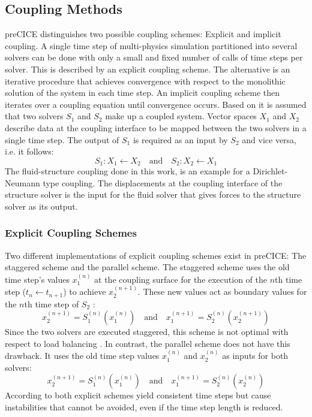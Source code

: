  \subsection{Coupling Methods} %
  preCICE distinguishes two possible coupling schemes: Explicit and implicit coupling. A single time step of multi-physics simulation partitioned into several solvers can be done with only a small and fixed number of calls of time steps per solver. This is described by an explicit coupling scheme. The alternative is an iterative procedure that achieves convergence with respect to the monolithic solution of the system in each time step. An implicit coupling scheme then iterates over a coupling equation until convergence occurs. Based on \cite{bungartz2015fully} it is assumed that two solvers $S_1$ and $S_2$ make up a coupled system. Vector spaces $X_1$ and $X_2$ describe data at the coupling interface to be mapped between the two solvers in a single time step. The output of $S_1$ is required as an input by $S_2$ and vice versa, i.e. it follows:
  \begin{equation}
  S_1: X_1 \leftarrow X_2\quad \text{and}\quad S_2:X_2 \leftarrow X_1
  \end{equation}
  The fluid-structure coupling done in this work, is an example for a Dirichlet-Neumann type coupling. The displacements at the coupling interface of the structure solver is the input for the fluid solver that gives forces to the structure solver as its output.
 
  \subsubsection{Explicit Coupling Schemes}
   Two different implementations of explicit coupling schemes exist in preCICE: The staggered scheme and the parallel scheme. The staggered scheme uses the old time step's values $x_1^{(n)}$ at the coupling surface for the execution of the $n$th time step ($t_n \leftarrow t_{n+1}$) to achieve $x_2^{(n+1)}$. These new values act as boundary values for the $n$th time step of $S_2$ \cite{bungartz2015fully}:
   \begin{equation}
   x_2^{(n+1)} = S_1^{(n)}\left( x_1^{(n)} \right)\quad \text{and}\quad x_1^{(n+1)} = S_2^{(n)}\left( x_2^{(n+1)} \right)
   \end{equation}
   Since the two solvers are executed staggered, this scheme is not optimal with respect to load balancing \cite{bungartz2015fully}. In contrast, the parallel scheme does not have this drawback. It uses the old time step values $x_1^{(n)}$ and $x_2^{(n)}$ as inputs for both solvers:
   \begin{equation}
   x_2^{(n+1)} = S_1^{(n)}\left( x_1^{(n)} \right)\quad \text{and}\quad x_1^{(n+1)} = S_2^{(n)}\left( x_2^{(n)} \right)
   \end{equation}
   According to \cite{bungartz2015fully} both explicit schemes yield consistent time steps but cause instabilities that cannot be avoided, even if the time step length is reduced.
  
